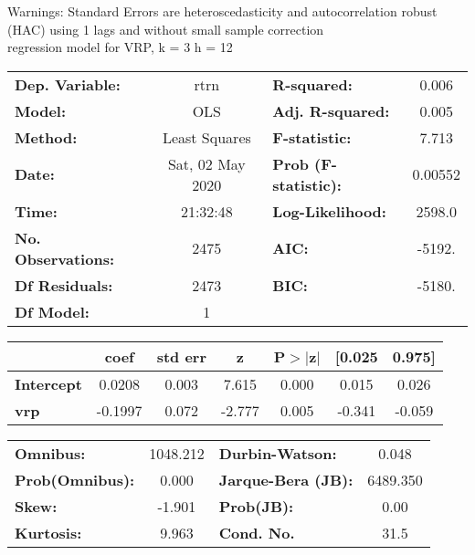 Warnings: \newline
 [1] Standard Errors are heteroscedasticity and autocorrelation robust (HAC) using 1 lags and without small sample correction\\ 

regression model for VRP, k = 3 h = 12\begin{center}
\begin{tabular}{lclc}
\toprule
\textbf{Dep. Variable:}    &       rtrn       & \textbf{  R-squared:         } &     0.006   \\
\textbf{Model:}            &       OLS        & \textbf{  Adj. R-squared:    } &     0.005   \\
\textbf{Method:}           &  Least Squares   & \textbf{  F-statistic:       } &     7.713   \\
\textbf{Date:}             & Sat, 02 May 2020 & \textbf{  Prob (F-statistic):} &  0.00552    \\
\textbf{Time:}             &     21:32:48     & \textbf{  Log-Likelihood:    } &    2598.0   \\
\textbf{No. Observations:} &        2475      & \textbf{  AIC:               } &    -5192.   \\
\textbf{Df Residuals:}     &        2473      & \textbf{  BIC:               } &    -5180.   \\
\textbf{Df Model:}         &           1      & \textbf{                     } &             \\
\bottomrule
\end{tabular}
\begin{tabular}{lcccccc}
                   & \textbf{coef} & \textbf{std err} & \textbf{z} & \textbf{P$> |$z$|$} & \textbf{[0.025} & \textbf{0.975]}  \\
\midrule
\textbf{Intercept} &       0.0208  &        0.003     &     7.615  &         0.000        &        0.015    &        0.026     \\
\textbf{vrp}       &      -0.1997  &        0.072     &    -2.777  &         0.005        &       -0.341    &       -0.059     \\
\bottomrule
\end{tabular}
\begin{tabular}{lclc}
\textbf{Omnibus:}       & 1048.212 & \textbf{  Durbin-Watson:     } &    0.048  \\
\textbf{Prob(Omnibus):} &   0.000  & \textbf{  Jarque-Bera (JB):  } & 6489.350  \\
\textbf{Skew:}          &  -1.901  & \textbf{  Prob(JB):          } &     0.00  \\
\textbf{Kurtosis:}      &   9.963  & \textbf{  Cond. No.          } &     31.5  \\
\bottomrule
\end{tabular}
\end{center}

